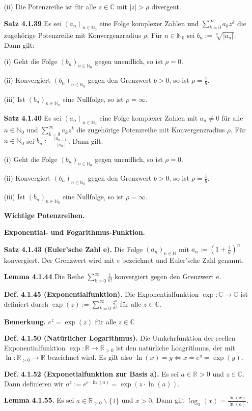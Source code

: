 (ii) Die Potenzreihe ist für alle $z\in \mathbb C$ mit $\vert z \vert > \rho$ divergent.

\textbf{Satz 4.1.39} Es sei $(a_n)_{n \in \mathbb N_0}$ eine Folge komplexer Zahlen und $\sum_{k=0}^\infty a_k z^k$ die zugehörige Potenzreihe mit Konvergenzradius $\rho$. Für $n \in \mathbb N_0$ sei $b_n := \sqrt[n]{\vert a_n \vert}$. Dann gilt:

(i) Geht die Folge $(b_n)_{n \in \mathbb N_0}$ gegen unendlich, so ist $\rho = 0$.

(ii) Konvergiert $(b_n)_{n \in \mathbb N_0}$ gegen den Grenzwert $b > 0$, so ist $\rho = \frac{1}{b}$.

(iii) Ist $(b_n)_{n \in \mathbb N_0}$ eine Nullfolge, so ist $\rho = \infty$.

\textbf{Satz 4.1.40} Es sei $(a_n)_{n \in \mathbb N_0}$ eine Folge komplexer Zahlen mit $a_n \neq 0$ für alle $n \in \mathbb N_0$ und $\sum_{k=0}^\infty a_k z^k$ die zugehörige Potenzreihe mit Konvergenzradius $\rho$. Für $n \in \mathbb N_0$ sei $b_n := \frac{\vert a_{n+1} \vert }{\vert a_n \vert}$. Dann gilt:

(i) Geht die Folge $(b_n)_{n \in \mathbb N_0}$ gegen unendlich, so ist $\rho = 0$.

(ii) Konvergiert $(b_n)_{n \in \mathbb N_0}$ gegen den Grenzwert $b > 0$, so ist $\rho = \frac{1}{b}$.

(iii) Ist $(b_n)_{n \in \mathbb N_0}$ eine Nullfolge, so ist $\rho = \infty$.

\textbf{Wichtige Potenzreihen.}

\textbf{Exponential- und Fogarithmus-Funktion.}

\textbf{Satz 4.1.43 (Euler’sche Zahl e).} Die Folge $(a_n)_{n \in \mathbb N}$ mit $a_n := (1+\frac{1}{n})^n$ konvergiert. Der Grenzwert wird mit e bezeichnet und Euler’sche Zahl genannt.

\textbf{Lemma 4.1.44} Die Reihe $\sum_{k=0}^\infty \frac{1}{k!}$ konvergiert gegen den Grenzwert e.

\textbf{Def. 4.1.45 (Exponentialfunktion).} Die Exponentialfunktion $\exp : \mathbb C \rightarrow \mathbb C$ ist definiert durch $\exp (z) :=  \sum_{k=0}^\infty \frac{z^k}{k!}$ für alle $z \in \mathbb C$.

\textbf{Bemerkung.} $e^z = \exp (z)$ für alle $z \in \mathbb C$

\textbf{Def. 4.1.50 (Natürlicher Logarithmus).} Die  Umkehrfunktion der reellen Exponentialfunktion $\exp : \mathbb R \rightarrow \mathbb R_{>0}$ ist den natürliche Loagrithmus, der mit $\ln : \mathbb R_{>0} \rightarrow \mathbb R$ bezeichnet wird. Es gilt also $\ln(x) = y \Leftrightarrow x = e^y = \exp(y)$.

\textbf{Def. 4.1.52 (Exponetialfunktion zur Basis a).} Es sei $a\in \mathbb R>0$ und $z \in \mathbb C$. Dann definieren wir $a^z := e^{e\cdot \ln(a)} = \exp(z\cdot \ln(a))$.

\textbf{Lemma 4.1.55.} Es sei $a \in \mathbb R_{>0} \backslash \{1\}$ und $x > 0$. Dann gilt $\log_a(x) = \frac{\ln(x)}{\ln(a)}$.

